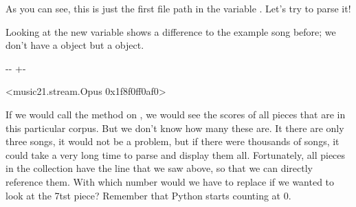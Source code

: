 \documentclass[letterpaper,10pt,english]{sphinxmanual}
\newlength\nbsphinxcodecellspacing
\begin{document}
As you can see, this is just the first file path in the variable . Let’s try to parse it!

{
\begin{sphinxVerbatim}[commandchars=\\\{\}]
\llap{\color{nbsphinxin}[13]:\,\hspace{\fboxrule}\hspace{\fboxsep}}  \PYG{p}{[}\PYG{p}{]}
\end{sphinxVerbatim}
}

Looking at the new variable  shows a difference to the example song before; we don’t have a  object but a  object.

{
\begin{sphinxVerbatim}[commandchars=\\\{\}]
\llap{\color{nbsphinxin}[14]:\,\hspace{\fboxrule}\hspace{\fboxsep}}
\end{sphinxVerbatim}
}

{

\kern-\sphinxverbatimsmallskipamount\kern-\baselineskip
\kern+\FrameHeightAdjust\kern-\fboxrule
\vspace{\nbsphinxcodecellspacing}

\begin{sphinxVerbatim}[commandchars=\\\{\}]
\llap{\color{nbsphinxout}[14]:\,\hspace{\fboxrule}\hspace{\fboxsep}}<music21.stream.Opus 0x1f8f0ff0af0>
\end{sphinxVerbatim}
}

If we would call the  method on , we would see the scores of all pieces that are in this particular corpus. But we don’t know how many these are. It there are only three songs, it would not be a problem, but if there were thousands of songs, it could take a very long time to parse and display them all. Fortunately, all pieces in the collection have the  line that we saw above, so that we can directly reference them. With which number would we have to replace
 if we wanted to look at the 7tst piece? Remember that Python starts counting at 0.
\end{document}
